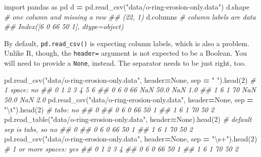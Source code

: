 \documentclass[
  12pt,
  krantz2]{krantz}
\makeatletter
\newenvironment{Shaded}{\begin{snugshade}}{\end{snugshade}}
\newcommand{\CharTok}[1]{\textcolor[rgb]{0.5,0.5,0.5}{#1}}
\newcommand{\CommentTok}[1]{\textcolor[rgb]{0.37,0.37,0.37}{\textit{#1}}}
\newcommand{\DecValTok}[1]{\textcolor[rgb]{0.06,0.06,0.06}{#1}}
\newcommand{\ImportTok}[1]{#1}
\newcommand{\NormalTok}[1]{#1}
\newcommand{\OperatorTok}[1]{\textcolor[rgb]{0.43,0.43,0.43}{\textbf{#1}}}
\newcommand{\StringTok}[1]{\textcolor[rgb]{0.5,0.5,0.5}{#1}}
\newcommand{\VariableTok}[1]{\textcolor[rgb]{0,0,0}{#1}}
\newenvironment{kframe}{%
\medskip{}
\setlength{\fboxsep}{.8em}
 \def\at@end@of@kframe{}%
 \ifinner\ifhmode%
  \def\at@end@of@kframe{\end{minipage}}%
  \begin{minipage}{\columnwidth}%
 \fi\fi%
 \def\FrameCommand##1{\hskip\@totalleftmargin \hskip-\fboxsep
 \colorbox{shadecolor}{##1}\hskip-\fboxsep
     \hskip-\linewidth \hskip-\@totalleftmargin \hskip\columnwidth}%
 \MakeFramed {\advance\hsize-\width
   \@totalleftmargin\z@ \linewidth\hsize
   \@setminipage}}%
 {\par\unskip\endMakeFramed%
 \at@end@of@kframe}
\renewenvironment{Shaded}{\begin{kframe}}{\end{kframe}}
\makeatother
\begin{document}
\begin{Shaded}
\begin{Highlighting}[]
\ImportTok{import}\NormalTok{ pandas }\ImportTok{as}\NormalTok{ pd}
\NormalTok{d }\OperatorTok{=}\NormalTok{ pd.read\_csv(}\StringTok{"data/o{-}ring{-}erosion{-}only.data"}\NormalTok{)}
\NormalTok{d.shape }\CommentTok{\# one column and missing a row}
\CommentTok{\#\# (22, 1)}
\NormalTok{d.columns }\CommentTok{\# column labels are data}
\CommentTok{\#\# Index([\textquotesingle{}6 0 66  50  1\textquotesingle{}], dtype=\textquotesingle{}object\textquotesingle{})}
\end{Highlighting}
\end{Shaded}

By default, \texttt{pd.read\_csv()} is expecting column labels, which is also a problem. Unlike R, though, the \texttt{header=} argument is not expected to be a Boolean. You will need to provide a \texttt{None}, instead. The separator needs to be just right, too.

\begin{Shaded}
\begin{Highlighting}[]
\NormalTok{pd.read\_csv(}\StringTok{"data/o{-}ring{-}erosion{-}only.data"}\NormalTok{, }
\NormalTok{            header}\OperatorTok{=}\VariableTok{None}\NormalTok{, sep }\OperatorTok{=} \StringTok{" "}\NormalTok{).head(}\DecValTok{2}\NormalTok{) }\CommentTok{\# 1 space: no}
\CommentTok{\#\#    0  1   2   3     4   5    6}
\CommentTok{\#\# 0  6  0  66 NaN  50.0 NaN  1.0}
\CommentTok{\#\# 1  6  1  70 NaN  50.0 NaN  2.0}
\NormalTok{pd.read\_csv(}\StringTok{"data/o{-}ring{-}erosion{-}only.data"}\NormalTok{, }
\NormalTok{            header}\OperatorTok{=}\VariableTok{None}\NormalTok{, sep }\OperatorTok{=} \StringTok{"}\CharTok{\textbackslash{}t}\StringTok{"}\NormalTok{).head(}\DecValTok{2}\NormalTok{) }\CommentTok{\# tabs: no}
\CommentTok{\#\#                0}
\CommentTok{\#\# 0  6 0 66  50  1}
\CommentTok{\#\# 1  6 1 70  50  2}
\NormalTok{pd.read\_table(}\StringTok{"data/o{-}ring{-}erosion{-}only.data"}\NormalTok{, }
\NormalTok{              header}\OperatorTok{=}\VariableTok{None}\NormalTok{).head(}\DecValTok{2}\NormalTok{) }\CommentTok{\# default sep is tabs, so no}
\CommentTok{\#\#                0}
\CommentTok{\#\# 0  6 0 66  50  1}
\CommentTok{\#\# 1  6 1 70  50  2}
\NormalTok{pd.read\_csv(}\StringTok{"data/o{-}ring{-}erosion{-}only.data"}\NormalTok{, }
\NormalTok{            header}\OperatorTok{=}\VariableTok{None}\NormalTok{, sep }\OperatorTok{=} \StringTok{"\textbackslash{}s+"}\NormalTok{).head(}\DecValTok{2}\NormalTok{) }\CommentTok{\# 1 or more spaces: yes}
\CommentTok{\#\#    0  1   2   3  4}
\CommentTok{\#\# 0  6  0  66  50  1}
\CommentTok{\#\# 1  6  1  70  50  2}
\end{Highlighting}
\end{Shaded}
\end{document}
